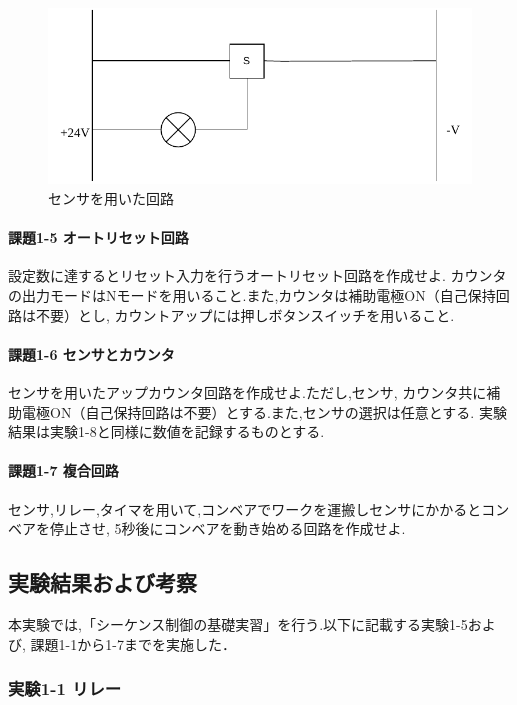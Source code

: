 \begin{figure}[H]
  \centering
  \includegraphics[scale=0.5]{sozai/4.pdf}
  \caption{センサを用いた回路}
\end{figure}

\paragraph{課題1-5 オートリセット回路}
設定数に達するとリセット入力を行うオートリセット回路を作成せよ.
カウンタの出力モードはNモードを用いること.また,カウンタは補助電極ON（自己保持回路は不要）とし,
カウントアップには押しボタンスイッチを用いること.

\paragraph{課題1-6 センサとカウンタ}
センサを用いたアップカウンタ回路を作成せよ.ただし,センサ,
カウンタ共に補助電極ON（自己保持回路は不要）とする.また,センサの選択は任意とする.
実験結果は実験1-8と同様に数値を記録するものとする.

\paragraph{課題1-7 複合回路}
センサ,リレー,タイマを用いて,コンベアでワークを運搬しセンサにかかるとコンベアを停止させ,
5秒後にコンベアを動き始める回路を作成せよ.


\newpage

\subsection{実験結果および考察}

本実験では,「シーケンス制御の基礎実習」を行う.以下に記載する実験1-5および,
課題1-1から1-7までを実施した．

\subsubsection{実験1-1 リレー}

